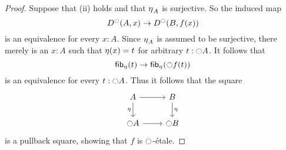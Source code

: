 \documentclass[9pt,twosided]{amsart}
\begin{document}
\begin{proof}
  Suppose that (ii) holds and that ${\eta_{}}_A$ is surjective. So the induced map
\begin{equation*}
D^{\ocircle}(A,x)\to D^{\ocircle}(B,f(x))
\end{equation*}
is an equivalence for every $x:A$. Since ${\eta_{}}_A$ is assumed to be surjective, there merely is an $x:A$ such that ${\eta_{}}(x)=t$ for arbitrary $t:{\ocircle} A$.
It follows that
\begin{equation*}
\fib{\modalunit}{t}\to \fib{\modalunit}{\modal f(t)}
\end{equation*}
is an equivalence for every $t:{\ocircle} A$. Thus it follows that the square
\begin{equation*}
\begin{tikzcd}
A \arrow[d,swap,"\modalunit"] \arrow[r] & B \arrow[d,"\modalunit"] \\
\modal A \arrow[r] & \modal B
\end{tikzcd}
\end{equation*}
is a pullback square, showing that $f$ is ${\ocircle}$-étale.
\end{proof}

\begin{comment}%
\begin{cor}
If $f:A\to B$ is $\modal$-\'etale, then the square
\begin{equation*}
\begin{tikzcd}[column sep=large]
A \arrow[d,swap,"\delta_{\modalunit}"] \arrow[r,"f"] & B \arrow[d,"\delta_{\modalunit}"] \\
A\times_{\modal A} A \arrow[r,swap,"f\times_{\modal f}f"] & B\times_{\modal B} B
\end{tikzcd}
\end{equation*}
is a pullback square.
\end{cor}

\begin{proof}
Consider the diagram
\begin{equation*}
\begin{tikzcd}[column sep=large]
A \arrow[d,swap,"\delta_{\modalunit}"] \arrow[r,"f"] & B \arrow[d,"\delta_{\modalunit}"] \\
A\times_{\modal A} A \arrow[d,swap,"\proj 1"] \arrow[r,"{f\times_{\modal f} f}"] & B\times_{\modal B} B \arrow[d,"\proj 1"] \\
A \arrow[r,"f"] & B
\end{tikzcd}
\end{equation*}
The bottom square is a pullback square by \cref{lem:etale_char}, and the outer rectangle is a pullback since both vertical composites are homotopic to the respective identity functions. Therefore the top square is a pullback.
\end{proof}
\end{comment}
\end{document}
